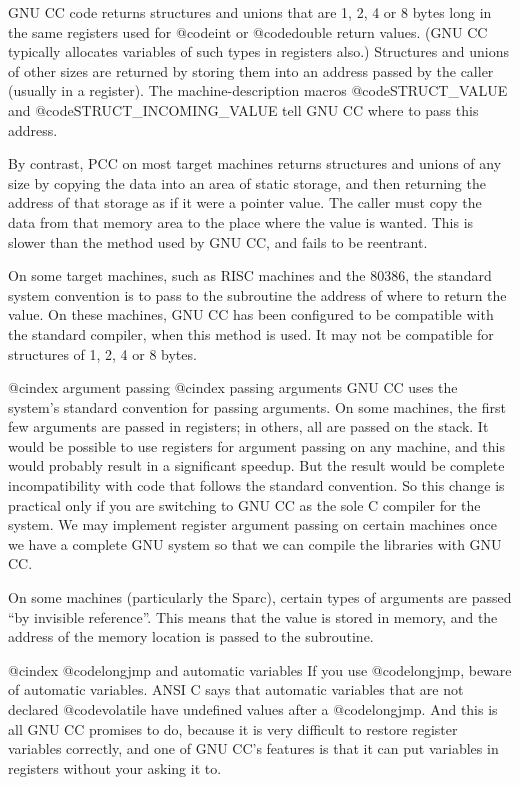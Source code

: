 GNU CC code returns structures and unions that are 1, 2, 4 or 8 bytes
long in the same registers used for @code{int} or @code{double} return
values.  (GNU CC typically allocates variables of such types in
registers also.)  Structures and unions of other sizes are returned by
storing them into an address passed by the caller (usually in a
register).  The machine-description macros @code{STRUCT_VALUE} and
@code{STRUCT_INCOMING_VALUE} tell GNU CC where to pass this address.

By contrast, PCC on most target machines returns structures and unions
of any size by copying the data into an area of static storage, and then
returning the address of that storage as if it were a pointer value.
The caller must copy the data from that memory area to the place where
the value is wanted.  This is slower than the method used by GNU CC, and
fails to be reentrant.

On some target machines, such as RISC machines and the 80386, the
standard system convention is to pass to the subroutine the address of
where to return the value.  On these machines, GNU CC has been
configured to be compatible with the standard compiler, when this method
is used.  It may not be compatible for structures of 1, 2, 4 or 8 bytes.

@cindex argument passing
@cindex passing arguments
GNU CC uses the system's standard convention for passing arguments.  On
some machines, the first few arguments are passed in registers; in
others, all are passed on the stack.  It would be possible to use
registers for argument passing on any machine, and this would probably
result in a significant speedup.  But the result would be complete
incompatibility with code that follows the standard convention.  So this
change is practical only if you are switching to GNU CC as the sole C
compiler for the system.  We may implement register argument passing on
certain machines once we have a complete GNU system so that we can
compile the libraries with GNU CC.

On some machines (particularly the Sparc), certain types of arguments
are passed ``by invisible reference''.  This means that the value is
stored in memory, and the address of the memory location is passed to
the subroutine.

@cindex @code{longjmp} and automatic variables
If you use @code{longjmp}, beware of automatic variables.  ANSI C says that
automatic variables that are not declared @code{volatile} have undefined
values after a @code{longjmp}.  And this is all GNU CC promises to do,
because it is very difficult to restore register variables correctly, and
one of GNU CC's features is that it can put variables in registers without
your asking it to.

